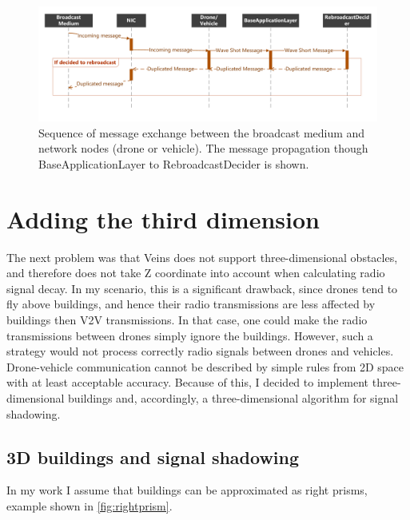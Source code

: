 \documentclass[]{nsm-thesis}
\begin{document}
\begin{figure}
	\centering
	\includegraphics[width=1\textwidth]{figures/RebroadcastDecider.pdf}
	\caption{Sequence of message exchange between the broadcast	medium and network nodes (drone or vehicle). The message propagation though BaseApplicationLayer to RebroadcastDecider is shown.}
	\label{fig:rebroadcastdeciderseq}
\end{figure}



\section{Adding the third dimension}

The next problem was that Veins does not support three-dimensional obstacles, and therefore does not take Z coordinate into account when calculating radio signal decay. In my scenario, this is a significant drawback, since drones tend to fly above buildings, and hence their radio transmissions are less affected by buildings then \ac{V2V} transmissions. In that case, one could make the radio transmissions between drones simply ignore the buildings. However, such a strategy would not process correctly radio signals between drones and vehicles. Drone-vehicle communication cannot be described by simple rules from 2D space with at least acceptable accuracy. Because of this, I decided to implement three-dimensional buildings and, accordingly, a three-dimensional algorithm for signal shadowing.



\subsection{3D buildings and signal shadowing}
\label{sec:3dBuildings}

In my work I assume that buildings can be approximated as right prisms, example shown in \cref{fig:rightprism}. 
\end{document}
